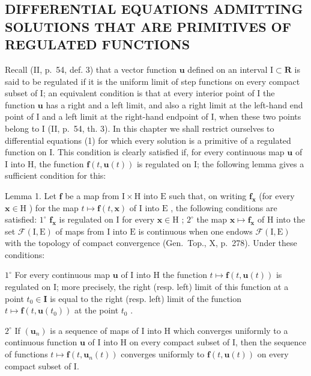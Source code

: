 \subsection{DIFFERENTIAL EQUATIONS ADMITTING SOLUTIONS THAT ARE PRIMITIVES OF REGULATED FUNCTIONS}

Recall (II, p.~54, def. 3) that a vector function \(\mathbf{u}\) defined on an interval \(\mathrm{I} \subset \mathbf{R}\) is said to be regulated if it is the uniform limit of step functions on every compact subset of I; an equivalent condition is that at every interior point of I the function \(\mathbf{u}\) has a right and a left limit, and also a right limit at the left-hand end point of I and a left limit at the right-hand endpoint of I, when these two points belong to I (II, p.~54, th. 3). In this chapter we shall restrict ourselves to differential equations (1) for which every solution is a primitive of a regulated function on I. This condition is clearly satisfied if, for every continuous map \(\mathbf{u}\) of I into H, the function \(\mathbf{f}(t, \mathbf{u}(t))\) is regulated on I; the following lemma gives a sufficient condition for this:

Lemma 1. Let \(\mathbf{f}\) be a map from \(\mathrm{I} \times \mathrm{H}\) into \(\mathrm{E}\) such that, on writing \(\mathbf{f}_{\mathbf{x}}\) (for every \(\mathbf{x} \in \mathrm{H}\) ) for the map \(t \mapsto \mathbf{f}(t, \mathbf{x})\) of \(\mathrm{I}\) into \(\mathrm{E}\) , the following conditions are satisfied: \(1^{\circ}\) \(\mathbf{f}_{\mathbf{x}}\) is regulated on \(\mathrm{I}\) for every \(\mathbf{x} \in \mathrm{H}\) ; \(2^{\circ}\) the map \(\mathbf{x} \mapsto \mathbf{f}_{\mathbf{x}}\) of \(\mathrm{H}\) into the set \(\mathcal{F}(\mathrm{I}, \mathrm{E})\) of maps from \(\mathrm{I}\) into \(\mathrm{E}\) is continuous when one endows \(\mathcal{F}(\mathrm{I}, \mathrm{E})\) with the topology of compact convergence (Gen.~Top., X, p.~278). Under these conditions:

\(1^{\circ}\) For every continuous map \(\mathbf{u}\) of I into H the function \(t \mapsto \mathbf{f}(t, \mathbf{u}(t))\) is regulated on I; more precisely, the right (resp. left) limit of this function at a point \(t_0 \in \mathbf{I}\) is equal to the right (resp. left) limit of the function \(t \mapsto \mathbf{f}(t, \mathbf{u}(t_0))\) at the point \(t_0\) .

\(2^{\circ}\) If \((\mathbf{u}_n)\) is a sequence of maps of I into H which converges uniformly to a continuous function \(\mathbf{u}\) of I into H on every compact subset of I, then the sequence of functions \(t \mapsto \mathbf{f}(t, \mathbf{u}_n(t))\) converges uniformly to \(\mathbf{f}(t, \mathbf{u}(t))\) on every compact subset of I.

